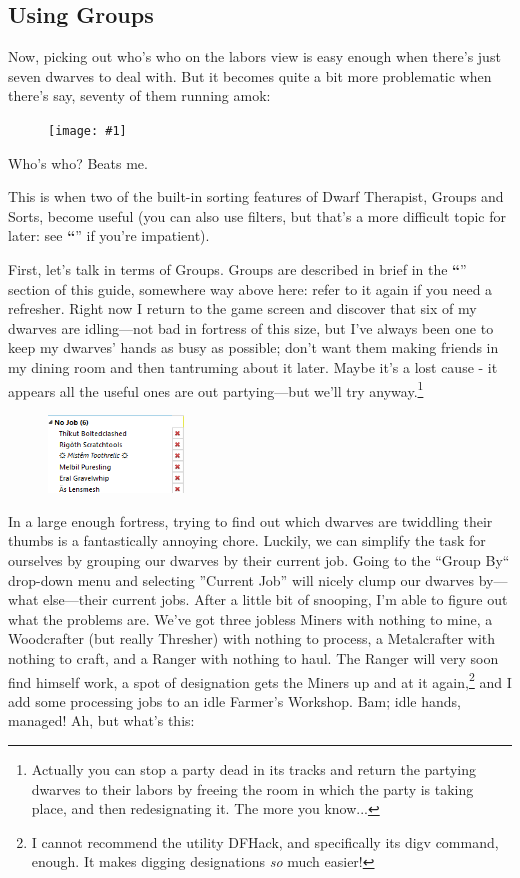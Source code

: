 \documentclass[]{article}
\newcommand{\jump}[1] {\textbf{``\nameref{sec:#1}}''}
\newcommand{\fullfigure}[1] {
\begin{figure}[h!]
\texttt{[image: \#1]}
\end{figure}
}
\newcommand{\fullfigurecaption}[1] {
\begin{center}
\vspace{-12pt}
#1
\end{center}
}
\begin{document}
\newpage
\subsection{Using Groups}
\label{sec:Using Groups}

Now, picking out who's who on the labors view is easy enough when there's just seven dwarves to deal
with. But it becomes quite a bit more problematic when there's say, seventy of them running amok:
\fullfigure{Sec2Fig6}
\fullfigurecaption{Who's who? Beats me.}

This is when two of the built-in sorting features of Dwarf Therapist, Groups and Sorts,  become useful
(you can also use filters, but that's a more difficult topic for later: see 
\jump{Filter Scripts} if you're impatient).

First, let's talk in terms of Groups. Groups are described in brief in the \jump{Group
By and Filters} section of this guide, somewhere way above here: refer to it again if you need a
refresher. Right now I return to the game screen and discover that six of my dwarves are idling---not bad
in fortress of this size, but I've always been one to keep my dwarves' hands as busy as possible; don't
want them making friends in my dining room and then tantruming about it later. Maybe it's a lost cause -
it appears all the useful ones are out partying---but we'll try anyway.\footnote{Actually you can stop a
party dead in its tracks and return the partying dwarves to their labors by freeing the room in which the
party is taking place, and then redesignating it. The more you know...}

\begin{figure}
\vspace{-20pt}
  \begin{center}
    \includegraphics[width=0.32\textwidth]{Sec2Fig7}
  \end{center}
\vspace{-10pt}
\end{figure}
In a large enough fortress, trying to find out which dwarves are twiddling their thumbs is a
fantastically annoying chore. Luckily, we can simplify the task for ourselves by grouping our dwarves by
their current job. Going to the ``Group By`` drop-down menu and selecting ''Current Job'' will nicely clump
our dwarves by---what else---their current jobs. After a little bit of snooping, I'm able to figure out
what the problems are. We've got three jobless Miners with nothing to mine, a Woodcrafter (but really
Thresher) with nothing to process, a Metalcrafter with nothing to craft, and a Ranger with nothing to
haul. The Ranger will very soon find himself work, a spot of designation gets the Miners up and at it
again,\footnote{I cannot recommend the utility DFHack, and specifically its digv command, enough. It
makes digging designations \emph{so} much easier!} and I add some processing jobs to an idle Farmer's
Workshop. Bam; idle hands, managed! Ah, but what's this:
\end{document}
